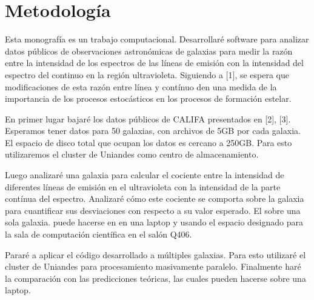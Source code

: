 \documentclass[12pt]{article}
\begin{document}
\section{Metodolog\'ia}



Esta monograf\'ia es un trabajo computacional. Desarrollar\'e software
para analizar datos p\'ublicos de observaciones astron\'omicas de
galaxias para medir la raz\'on entre la intensidad de los espectros de las
l\'ineas de emisi\'on con la intensidad del espectro del continuo en
la regi\'on ultravioleta.  Siguiendo a [1], se espera que
modificaciones de esta raz\'on entre l\'inea y cont\'inuo den una medida de la importancia de
 los procesos estoc\'asticos en los procesos de formaci\'on estelar.

En primer lugar bajar\'e los datos p\'ublicos de CALIFA presentados
en [2], [3].
Esperamos tener datos para 50 galaxias, con archivos de 5GB por cada
galaxia.
El espacio de disco total que ocupan los datos es cercano a 250GB.
Para esto utilizaremos el cluster de Uniandes como centro de
almacenamiento.

Luego analizar\'e una galaxia para calcular el cociente entre
la intensidad de diferentes l\'ineas de emisi\'on en el ultravioleta
con la intensidad de la parte cont\'inua del espectro.
Analizar\'e c\'omo este cociente se comporta sobre la galaxia para
cuantificar sus desviaciones con respecto a su valor esperado.
El sobre una sola galaxia. puede hacerse en  en una laptop y usando el
espacio designado para la sala de computaci\'on cient\'ifica en el
sal\'on Q406.

Parar\'e a aplicar el c\'odigo desarrollado a m\'ultiples galaxias.
Para esto utilizar\'e el cluster de Uniandes para procesamiento masivamente
paralelo.
Finalmente har\'e la comparaci\'on con las predicciones te\'oricas,
las cuales pueden hacerse sobre una laptop.


\end{document}
